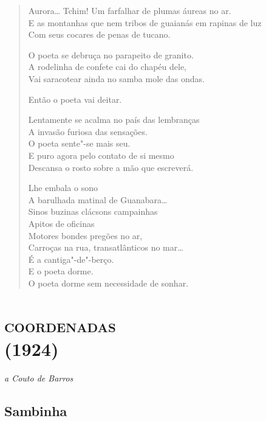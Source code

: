 \begin{verse}
Aurora\ldots{} Tchim! Um farfalhar de plumas áureas no ar.\\
E as montanhas que nem tribos de guaianás em rapinas de luz\\
Com seus cocares de penas de tucano.

O poeta se debruça no parapeito de granito.\\
A rodelinha de confete cai do chapéu dele,\\
Vai saracotear ainda no samba mole das ondas.

Então o poeta vai deitar.

Lentamente se acalma no país das lembranças\\
A invasão furiosa das sensações.\\
O poeta sente"-se mais seu.\\
E puro agora pelo contato de si mesmo\\
Descansa o rosto sobre a mão que escreverá.

Lhe embala o sono\\
A barulhada matinal de Guanabara\ldots{}\\
Sinos buzinas clácsons campainhas\\
Apitos de oficinas\\
Motores bondes pregões no ar,\\
Carroças na rua, transatlânticos no mar\ldots{}\\
É a cantiga"-de"-berço.\\
E o poeta dorme.\\

O poeta dorme sem necessidade de sonhar.
\end{verse}

\chapter[\textsc{coordenadas}\\Sambinha]{\textsc{coordenadas}\\(1924)}

\hfill\emph{a Couto de Barros}

\section*{Sambinha}

